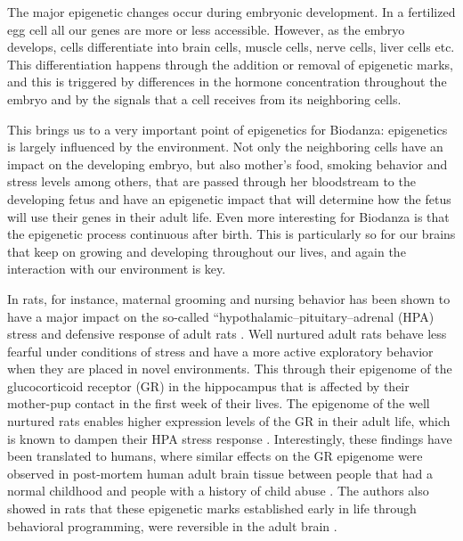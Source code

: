 \documentclass[
  11pt,
]{book}
\begin{document}
The major epigenetic changes occur during embryonic development. In a fertilized egg cell all our genes are more or less accessible. However, as the embryo develops, cells differentiate into brain cells, muscle cells, nerve cells, liver cells etc. This differentiation happens through the addition or removal of epigenetic marks, and this is triggered by differences in the hormone concentration throughout the embryo and by the signals that a cell receives from its neighboring cells.

This brings us to a very important point of epigenetics for Biodanza: epigenetics is largely influenced by the environment. Not only the neighboring cells have an impact on the developing embryo, but also mother's food, smoking behavior and stress levels among others, that are passed through her bloodstream to the developing fetus and have an epigenetic impact that will determine how the fetus will use their genes in their adult life. Even more interesting for Biodanza is that the epigenetic process continuous after birth. This is particularly so for our brains that keep on growing and developing throughout our lives, and again the interaction with our environment is key.

In rats, for instance, maternal grooming and nursing behavior has been shown to have a major impact on the so-called ``hypothalamic--pituitary--adrenal (HPA) stress and defensive response of adult rats \citep{Meaney2004}. Well nurtured adult rats behave less fearful under conditions of stress and have a more active exploratory behavior when they are placed in novel environments. This through their epigenome of the glucocorticoid receptor (GR) in the hippocampus that is affected by their mother-pup contact in the first week of their lives. The epigenome of the well nurtured rats enables higher expression levels of the GR in their adult life, which is known to dampen their HPA stress response \citep{Meaney2004, Meaney2005}. Interestingly, these findings have been translated to humans, where similar effects on the GR epigenome were observed in post-mortem human adult brain tissue between people that had a normal childhood and people with a history of child abuse \citep{Meaney2009}. The authors also showed in rats that these epigenetic marks established early in life through behavioral programming, were reversible in the adult brain \citep{Meaney2005}.
\end{document}

